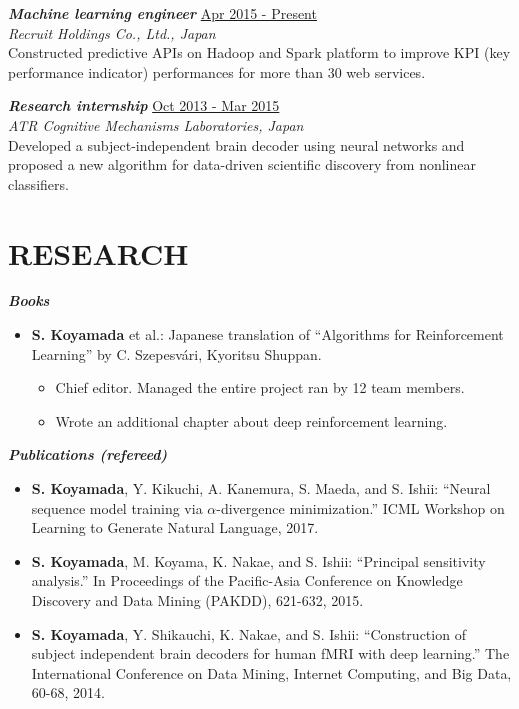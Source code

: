 \documentclass[margin, 10pt]{res} %
\begin{document}
\begin{resume}
{\sl {\bf Machine learning engineer}} \hfill {\small \underline{Apr 2015 - Present}}\\
{\it Recruit Holdings Co., Ltd., Japan} \\
Constructed predictive APIs on Hadoop and Spark platform to improve KPI (key performance indicator) performances for more than 30 web services.

{\sl {\bf Research internship}} \hfill {\small \underline{Oct 2013 - Mar 2015}} \\
{\it ATR Cognitive Mechanisms Laboratories, Japan}  \\
Developed a subject-independent brain decoder using neural networks and proposed a new algorithm for data-driven scientific discovery from nonlinear classifiers.

\section{{\small RESEARCH} }
{\sl {\bf Books}} \vspace{0.5em}
\begin{itemize}
\item {\bf S. Koyamada} et al.: Japanese translation of ``Algorithms for Reinforcement Learning'' by C. Szepesv{\'a}ri, Kyoritsu Shuppan.
  \begin{itemize}
  \item Chief editor. Managed the entire project ran by 12 team members.
  \item Wrote an additional chapter about deep reinforcement learning.
  \end{itemize}
\end{itemize}

{\sl {\bf Publications (refereed)}} \vspace{0.5em}
\begin{itemize}
\item {\bf S. Koyamada}, Y. Kikuchi, A. Kanemura, S. Maeda, and S. Ishii: ``Neural sequence model training via $\alpha$-divergence minimization.'' ICML Workshop on Learning to Generate Natural Language, 2017.
\item {\bf S. Koyamada}, M. Koyama, K. Nakae, and S. Ishii: ``Principal sensitivity analysis.'' In Proceedings of the Pacific-Asia Conference on Knowledge Discovery and Data Mining (PAKDD), 621-632, 2015.
\item {\bf S. Koyamada}, Y. Shikauchi, K. Nakae, and S. Ishii: ``Construction of subject independent brain decoders for human fMRI with deep learning.'' The International Conference on Data Mining, Internet Computing, and Big Data, 60-68, 2014.
\end{itemize}


\end{resume}
\end{document}
